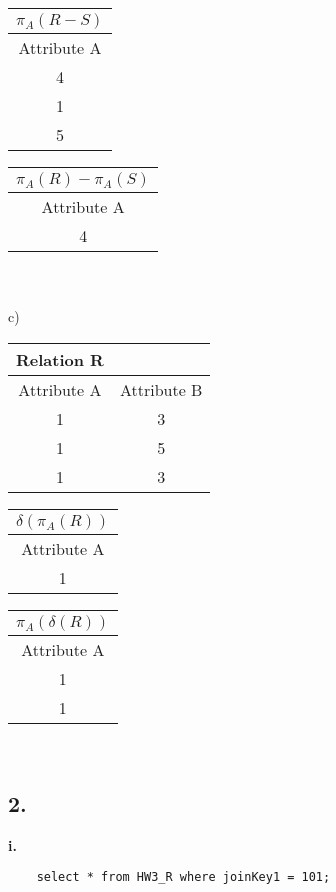 \documentclass[12pt, letterpaper, fleqn]{article}
\begin{document}
  \begin{tabular} {| c |}
    \hline
    $\pi_A (R - S)$   \\ \hline
    Attribute A  \\ \hline
    4  \\
    1  \\
    5  \\ \hline
  \end{tabular} 

  \begin{tabular} {| c |}
    \hline
    $\pi_A (R) - \pi_A (S)$  \\ \hline
    Attribute A  \\ \hline
    4  \\ \hline
  \end{tabular} \\
  \\

  c) \\
  \begin{tabular} {|c c|}
    \hline
    Relation R & \\ \hline
    Attribute A & Attribute B \\ \hline
    1  &  3 \\
    1  &  5 \\
    1  &  3 \\
    \hline
  \end{tabular}
  
  \begin{tabular} {| c |}
    \hline
    $\delta (\pi_A (R) )$   \\ \hline
    Attribute A  \\ \hline
    1  \\ \hline
  \end{tabular} 

  \begin{tabular} {| c |}
    \hline
    $\pi_A (\delta(R) )$  \\ \hline
    Attribute A  \\ \hline
    1  \\ 
    1  \\ \hline
  \end{tabular} \\


  \subsection{2.}

  \textbf{i.}\\
  \begin{verbatim}
    select * from HW3_R where joinKey1 = 101;
  \end{verbatim}\\
\end{document}
